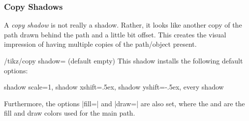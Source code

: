 \subsubsection{Copy Shadows}

A \emph{copy shadow} is not really a shadow. Rather, it looks like another copy
of the path drawn behind the path and a little bit offset. This creates the
visual impression of having multiple copies of the path/object present.

\begin{key}{/tikz/copy shadow= (default \normalfont empty)}
    This shadow installs the following default options:
\begin{codeexample}
  shadow scale=1, shadow xshift=.5ex, shadow yshift=-.5ex, every shadow
\end{codeexample}
    Furthermore, the options |fill=| and |draw=| are also set, where the  and  are
    the fill and draw colors used for the main path.
\begin{codeexample}[preamble={\usetikzlibrary{shapes.symbols}}]
\end{codeexample}
\end{key}

